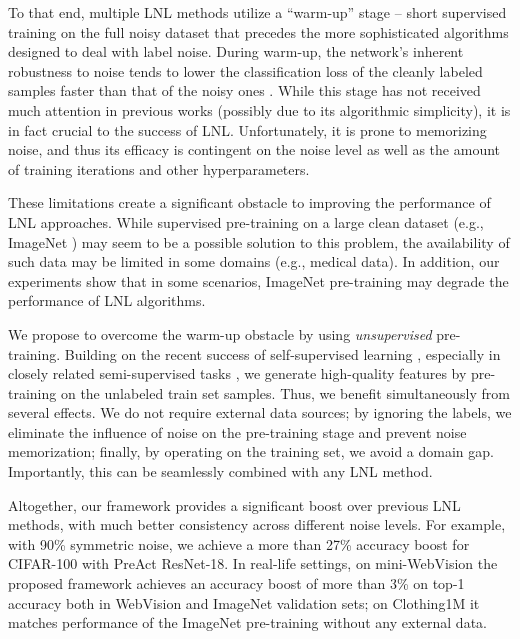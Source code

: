 \documentclass[10pt,twocolumn,letterpaper]{article}
\renewcommand{\cite}[1]{\citep{#1}}
\begin{document}
To that end, multiple LNL methods utilize a ``warm-up'' stage \cite{patrini2017making,han2019deepself,li2020dividemix,liu2020earlylearning} -- short supervised training on the full noisy dataset that precedes the more sophisticated algorithms designed to deal with label noise.
During warm-up, the network's inherent robustness to noise tends to lower the classification loss of the cleanly labeled samples faster than that of the noisy ones \cite{cicek2018speedas,liu2020earlylearning}. 
While this stage has not received much attention in previous works (possibly due to its algorithmic simplicity), it is in fact crucial to the success of LNL. Unfortunately, it is prone to memorizing noise, and thus its efficacy is contingent on the noise level as well as the amount of training iterations and other hyperparameters.

These limitations create a significant obstacle to improving the performance of LNL approaches.
While supervised pre-training on a large clean dataset (e.g., ImageNet \cite{ILSVRC15}) may seem to be a possible solution to this problem, the availability of such data may be limited in some domains (e.g., medical data). In addition, our experiments show that in some scenarios, ImageNet pre-training may degrade the performance of LNL algorithms.

We propose to overcome the warm-up obstacle by using \textit{unsupervised} pre-training. Building on the recent success of self-supervised learning \cite{henaff2019cpc2,chen2020simclr,tian2020infomin,zbontar2021barlow}, especially in closely related semi-supervised tasks \cite{chen2020simclr2}, we generate high-quality features by pre-training on the unlabeled train set samples.  Thus, we benefit simultaneously from several effects. We do not require external data sources; by ignoring the labels, we eliminate the influence of noise on the pre-training stage and prevent noise memorization;  finally, by operating on the training set, we avoid a domain gap.  Importantly, this can be seamlessly combined with any LNL method. 

Altogether, our framework provides a significant boost over previous LNL methods, with much better consistency across different noise levels. 
For example, with 90\% symmetric noise, we achieve a more than 27\% accuracy boost for CIFAR-100 with PreAct ResNet-18. 
In real-life settings, on mini-WebVision the proposed framework achieves an accuracy boost of more than 3\% on top-1 accuracy both in WebVision and ImageNet validation sets; on Clothing1M it matches performance of the ImageNet pre-training without any external data.
\end{document}
